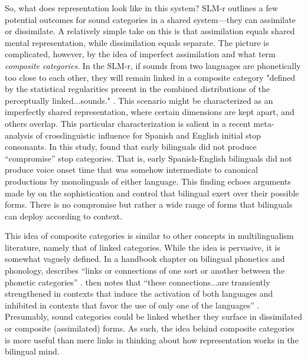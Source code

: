 So, what does representation look like in this system? SLM-r outlines a few potential outcomes for sound categories in a shared system—they can assimilate or dissimilate. A relatively simple take on this is that assimilation equals shared mental representation, while dissimilation equals separate. The picture is complicated, however, by the idea of imperfect assimilation and what \citeauthor{flege_2021_slmr} term \textit{composite categories}. In the SLM-r, if sounds from two languages are phonetically too close to each other, they will remain linked in a composite category "defined by the statistical regularities present in the combined distributions of the perceptually linked...sounds." \citep[][p. 41]{flege_2021_slmr}. This scenario might be characterized as an imperfectly shared representation, where certain dimensions are kept apart, and others overlap. This particular characterization is salient in a recent meta-analysis of crosslinguistic influence for Spanish and English initial stop consonants. In this study, \citet{casillas_2021_interlingual} found that early bilinguals did not produce ``compromise'' stop categories. That is, early Spanish-English bilinguals did not produce voice onset time that was somehow intermediate to canonical productions by monolinguals of either language. This finding echoes arguments made by \citet{bullock_2009_sociophonetics} on the sophistication and control that bilingual exert over their possible forms. There is no compromise but rather a wide range of forms that bilinguals can deploy according to context.

This idea of composite categories is similar to other concepts in multilingualism literature, namely that of linked categories. While the idea is pervasive, it is somewhat vaguely defined. In a handbook chapter on bilingual phonetics and phonology, \citeauthor{simonet_2016_bilingualism} describes ``links or connections of one sort or another between the phonetic categories'' \citeyearpar[][p. 10]{simonet_2016_bilingualism}. \citeauthor{simonet_2016_bilingualism} then notes that ``these connections...are transiently strengthened in contexts that induce the activation of both languages and inhibited in contexts that favor the use of only one of the languages'' \citeyearpar[][p. 10]{simonet_2016_bilingualism}. Presumably, sound categories could be linked whether they surface in dissimilated or composite (assimilated) forms. As such, the idea behind composite categories is more useful than mere links in thinking about how representation works in the bilingual mind. 

